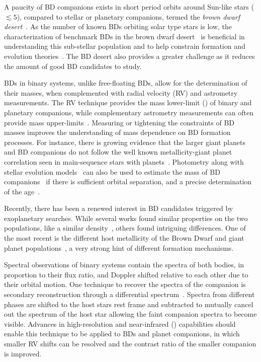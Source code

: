 A paucity of BD companions exists in short period orbits around Sun-like stars (\(\lesssim5 \)\AU), compared to stellar or planetary companions, termed the \emph{brown dwarf desert}~\citep{halbwachs_exploring_2000,zucker_analysis_2001,sahlmann_search_2011}. As the number of known BDs orbiting solar type stars is low, the characterization of benchmark BDs in the brown dwarf desert~\citep[e.g.][]{crepp_trends_2016} is beneficial in understanding this sub-stellar population and to help constrain formation and evolution theories~\citep{whitworth_formation_2007}. The BD desert also provides a greater challenge as it reduces the amount of good BD candidates to study.

BDs in binary systems, unlike free-floating BDs, allow for the determination of their masses, when complemented with radial velocity ({RV}) and astrometry measurements. The {RV} technique provides the mass lower-limit (\mtwosini{}) of binary and planetary companions, while complementary astrometry measurements can often provide mass upper-limits~\citep[e.g.][]{sahlmann_search_2011}. Measuring or tightening the constraints of BD masses improves the understanding of mass dependence on BD formation processes. For instance, there is growing evidence that the larger giant planets and BD companions do not follow the well known metallicity-giant planet correlation seen in main-sequence stars with planets~\citep[e.g.][]{santos_spectroscopic_2004,santos_observational_2017, maldonado_searching_2017}. Photometry along with stellar evolution models~\citep[e.g.][]{baraffe_evolutionary_2003,allard_btsettl_2013} can also be used to estimate the mass of BD companions~\citep[e.g.][]{moutou_eccentricity_2017} if there is sufficient orbital separation, and a precise determination of the age~\citep{soderblom_ages_2010}.

Recently, there has been a renewed interest in BD candidates triggered by exoplanetary searches. While several works found similar properties on the two populations, like a similar density~\citep{hatzes_definition_2015}, others found intriguing differences. One of the most recent is the different host metallicity of the Brown Dwarf and giant planet populations~\citep{santos_observational_2017, schlaufman_evidence_2018}, a very strong hint of different formation mechanisms.

Spectral observations of binary systems contain the spectra of both bodies, in proportion to their flux ratio, and Doppler shifted relative to each other due to their orbital motion. One technique to recover the spectra of the companion is secondary reconstruction through a differential spectrum~\citep{ferluga_separating_1997}. Spectra from different phases are shifted to the host stars rest frame and subtracted to mutually cancel out the spectrum of the host star allowing the faint companion spectra to become visible. Advances in high-resolution and near-infrared (\nir{}) capabilities should enable this technique to be applied to BDs and planet companions, in which smaller {RV} shifts can be resolved and the contrast ratio of the smaller companion is improved.

